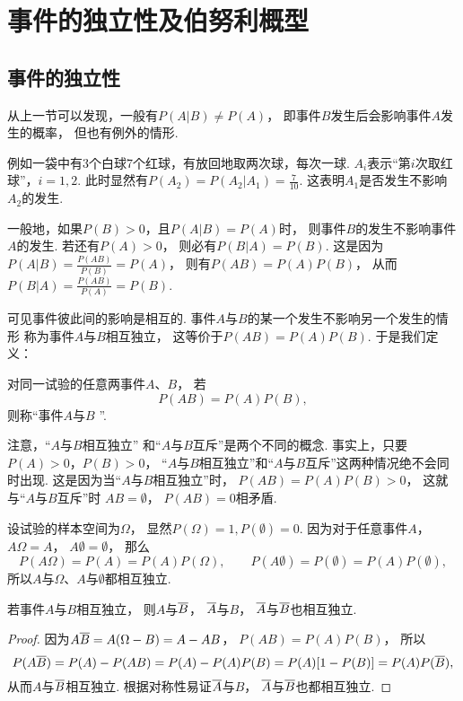 \section{事件的独立性及伯努利概型}
\subsection{事件的独立性}
从上一节可以发现，一般有\(P(A \vert B) \neq P(A)\)，
即事件\(B\)发生后会影响事件\(A\)发生的概率，
但也有例外的情形.

例如一袋中有3个白球7个红球，有放回地取两次球，每次一球.
\(A_i\)表示“第\(i\)次取红球”，\(i=1,2\).
此时显然有\(P(A_2) = P(A_2 \vert A_1) = \frac{7}{10}\).
这表明\(A_1\)是否发生不影响\(A_2\)的发生.

一般地，如果\(P(B) > 0\)，且\(P(A \vert B) = P(A)\)时，
则事件\(B\)的发生不影响事件\(A\)的发生.
若还有\(P(A) > 0\)，
则必有\(P(B \vert A) = P(B)\).
这是因为\(P(A \vert B) = \frac{P(AB)}{P(B)} = P(A)\)，
则有\(P(AB) = P(A) P(B)\)，
从而\(P(B \vert A) = \frac{P(AB)}{P(A)} = P(B)\).

可见事件彼此间的影响是相互的.
事件\(A\)与\(B\)的某一个发生不影响另一个发生的情形
称为事件\(A\)与\(B\)相互独立，
这等价于\(P(AB) = P(A) P(B)\).
于是我们定义：

\begin{definition}
对同一试验的任意两事件\(A\)、\(B\)，
若\begin{equation*}
	P(AB) = P(A) P(B),
\end{equation*}
则称“事件\(A\)与\(B\) ”.
\end{definition}

注意，“\(A\)与\(B\)相互独立”
和“\(A\)与\(B\)互斥”是两个不同的概念.
事实上，只要\(P(A) > 0\)，\(P(B) > 0\)，
“\(A\)与\(B\)相互独立”和“\(A\)与\(B\)互斥”这两种情况绝不会同时出现.
这是因为当“\(A\)与\(B\)相互独立”时，
\(P(AB) = P(A) P(B) > 0\)，
这就与“\(A\)与\(B\)互斥”时
\(AB = \emptyset\)，
\(P(AB) = 0\)相矛盾.

设试验的样本空间为\(\Omega\)，
显然\(P(\Omega) = 1,
P(\emptyset) = 0\).
因为对于任意事件\(A\)，
\(A \Omega = A\)，
\(A \emptyset = \emptyset\)，
那么\begin{equation*}
	P(A \Omega) = P(A) = P(A) P(\Omega), \qquad
	P(A \emptyset) = P(\emptyset) = P(A) P(\emptyset),
\end{equation*}
所以\(A\)与\(\Omega\)、\(A\)与\(\emptyset\)都相互独立.

\begin{theorem}
若事件\(A\)与\(B\)相互独立，
则\(A\)与\(\SetComplementaryL{B}\)，
\(\SetComplementaryL{A}\)与\(B\)，
\(\SetComplementaryL{A}\)与\(\SetComplementaryL{B}\)也相互独立.
\begin{proof}
因为\(A\SetComplementaryL{B}=A(\Omega-B)=A-AB\)，
\(P(AB)=P(A)P(B)\)，
所以\begin{equation*}
	P(A\SetComplementaryL{B})
	= P(A) - P(AB)
	= P(A) - P(A) P(B)
	= P(A) [1 - P(B)]
	= P(A) P(\SetComplementaryL{B}),
\end{equation*}
从而\(A\)与\(\SetComplementaryL{B}\)相互独立.
根据对称性易证\(\SetComplementaryL{A}\)与\(B\)，
\(\SetComplementaryL{A}\)与\(\SetComplementaryL{B}\)也都相互独立.
\end{proof}
\end{theorem}

